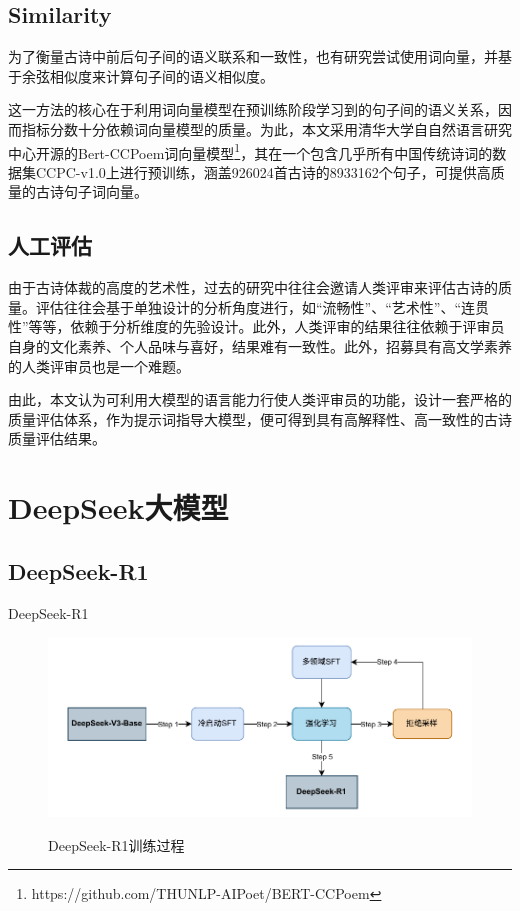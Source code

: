\subsection{Similarity}
为了衡量古诗中前后句子间的语义联系和一致性，也有研究尝试使用词向量，并基于余弦相似度来计算句子间的语义相似度。\cite{dengIterativePolishingFramework2020}

这一方法的核心在于利用词向量模型在预训练阶段学习到的句子间的语义关系，因而指标分数十分依赖词向量模型的质量。为此，本文采用清华大学自自然语言研究中心开源的Bert-CCPoem词向量模型\footnote{https://github.com/THUNLP-AIPoet/BERT-CCPoem}，其在一个包含几乎所有中国传统诗词的数据集CCPC-v1.0上进行预训练，涵盖926024首古诗的8933162个句子，可提供高质量的古诗句子词向量。

\subsection{人工评估}

由于古诗体裁的高度的艺术性，过去的研究中往往会邀请人类评审来评估古诗的质量。评估往往会基于单独设计的分析角度进行，如“流畅性”、“艺术性”、“连贯性”等等，依赖于分析维度的先验设计。此外，人类评审的结果往往依赖于评审员自身的文化素养、个人品味与喜好，结果难有一致性。此外，招募具有高文学素养的人类评审员也是一个难题。

由此，本文认为可利用大模型的语言能力行使人类评审员的功能，设计一套严格的质量评估体系，作为提示词指导大模型，便可得到具有高解释性、高一致性的古诗质量评估结果。


\section{DeepSeek大模型}
\subsection{DeepSeek-R1}

DeepSeek-R1\cite{deepseek-aiDeepSeekR1IncentivizingReasoning2025}

\begin{figure}[ht]
    \centering
    \includegraphics[width=1\textwidth]
    {figures/deepseek_r1_training.pdf}\\
    \caption{DeepSeek-R1训练过程}
    \label{fig:deepseek_r1_training} %
\end{figure}


